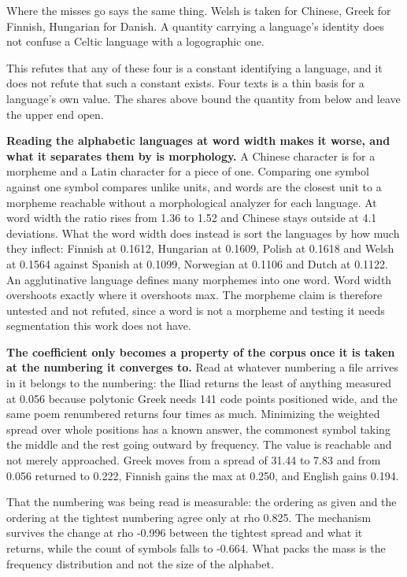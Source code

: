 Where the misses go says the same thing. Welsh is taken for Chinese, Greek for Finnish, Hungarian for Danish. A quantity carrying a language's identity does not confuse a Celtic language with a logographic one.

This refutes that any of these four is a constant identifying a language, and it does not refute that such a constant exists. Four texts is a thin basis for a language's own value. The shares above bound the quantity from below and leave the upper end open.

\textbf{Reading the alphabetic languages at word width makes it worse, and what it separates them by is morphology.} A Chinese character is for a morpheme and a Latin character for a piece of one. Comparing one symbol against one symbol compares unlike units, and words are the closest unit to a morpheme reachable without a morphological analyzer for each language. At word width the ratio rises from 1.36 to 1.52 and Chinese stays outside at 4.1 deviations. What the word width does instead is sort the languages by how much they inflect: Finnish at 0.1612, Hungarian at 0.1609, Polish at 0.1618 and Welsh at 0.1564 against Spanish at 0.1099, Norwegian at 0.1106 and Dutch at 0.1122. An agglutinative language defines many morphemes into one word. Word width overshoots exactly where it overshoots max. The morpheme claim is therefore untested and not refuted, since a word is not a morpheme and testing it needs segmentation this work does not have.

\textbf{The coefficient only becomes a property of the corpus once it is taken at the numbering it converges to.} Read at whatever numbering a file arrives in it belongs to the numbering: the Iliad returns the least of anything measured at 0.056 because polytonic Greek needs 141 code points positioned wide, and the same poem renumbered returns four times as much. Minimizing the weighted spread over whole positions has a known answer, the commonest symbol taking the middle and the rest going outward by frequency. The value is reachable and not merely approached. Greek moves from a spread of 31.44 to 7.83 and from 0.056 returned to 0.222, Finnish gains the max at 0.250, and English gains 0.194.

That the numbering was being read is measurable: the ordering as given and the ordering at the tightest numbering agree only at rho 0.825. The mechanism survives the change at rho -0.996 between the tightest spread and what it returns, while the count of symbols falls to -0.664. What packs the mass is the frequency distribution and not the size of the alphabet.

